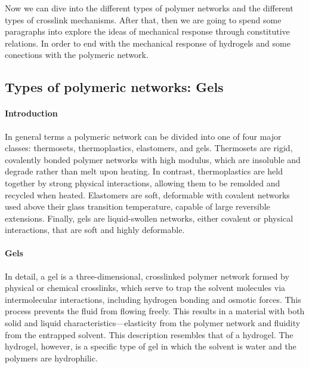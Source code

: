 Now we can dive into the different types of polymer networks and the different types of crosslink mechanisms.
After that, then we are going to spend some paragraphs into explore the ideas of mechanical response through constitutive relations.
In order to end with the mechanical response of hydrogels and some conections with the polymeric network.

\subsection{Types of polymeric networks: Gels}

\paragraph{Introduction} In general terms a polymeric network can be divided into one of four major classes: 
    thermosets,
    thermoplastics,
    elastomers,
    and gels.
Thermosets are rigid, covalently bonded polymer networks with high modulus, which are insoluble and degrade rather than melt upon heating. 
In contrast, thermoplastics are held together by strong physical interactions, allowing them to be remolded and recycled when heated. 
Elastomers are soft, deformable with covalent networks used above their glass transition temperature, capable of large reversible extensions. 
Finally, gels are liquid-swollen networks, either covalent or physical interactions, that are soft and highly deformable.

\paragraph{Gels} In detail, a gel is a three-dimensional, crosslinked polymer network formed by physical or chemical crosslinks, which serve to trap the solvent molecules via intermolecular interactions, including hydrogen bonding and osmotic forces. This process prevents the fluid from flowing freely.
This results in a material with both solid and liquid characteristics—elasticity from the polymer network and fluidity from the entrapped solvent.
This description resembles that of a hydrogel.
The hydrogel, however, is a specific type of gel in which the solvent is water and the polymers are hydrophilic.

